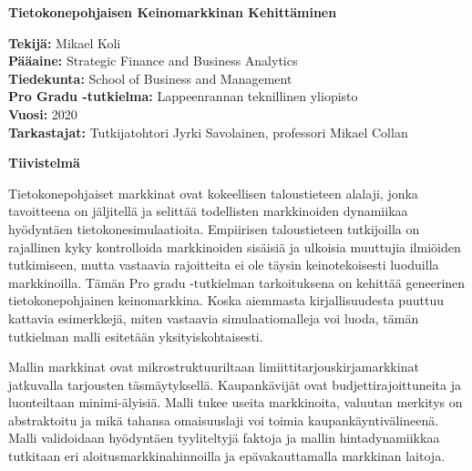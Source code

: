 

\thispagestyle{plain}
\begin{center}
    \Large
    \textbf{Tietokonepohjaisen Keinomarkkinan Kehitt\"aminen}
        
    \vspace{0.4cm}
        
    \vspace{0.4cm}
    \begin{flushleft}
        \normalsize
        \textbf{Tekijä:} Mikael Koli \\
        \textbf{Pääaine:} Strategic Finance and Business Analytics \\
        \textbf{Tiedekunta:} School of Business and Management \\
        \textbf{Pro Gradu -tutkielma:} Lappeenrannan teknillinen yliopisto  \\
        \textbf{Vuosi:} 2020 \\
        \textbf{Tarkastajat:} Tutkijatohtori Jyrki Savolainen, professori Mikael Collan
    \end{flushleft}
       
    \vspace{0.5cm}
    \textbf{Tiivistelmä}
\end{center}

Tietokonepohjaiset markkinat ovat kokeellisen taloustieteen alalaji, jonka tavoitteena
on jäljitellä ja selittää todellisten markkinoiden dynamiikaa hyödyntäen
tietokonesimulaatioita. Empiirisen taloustieteen tutkijoilla on rajallinen kyky kontrolloida
markkinoiden sisäisiä ja ulkoisia muuttujia ilmiöiden tutkimiseen, mutta vastaavia rajoitteita
ei ole täysin keinotekoisesti luoduilla markkinoilla. Tämän Pro gradu -tutkielman tarkoituksena on 
kehittää geneerinen tietokonepohjainen keinomarkkina. Koska aiemmasta kirjallisuudesta puuttuu 
kattavia esimerkkejä, miten vastaavia simulaatiomalleja voi luoda, tämän tutkielman malli esitetään
yksityiskohtaisesti.


Mallin markkinat ovat mikrostruktuuriltaan limiittitarjouskirjamarkkinat jatkuvalla tarjousten täsmäytyksellä.
Kaupankävijät ovat budjettirajoittuneita ja luonteiltaan minimi-älyisiä. Malli tukee useita markkinoita, 
valuutan merkitys on abstraktoitu ja mikä tahansa omaisuuslaji voi toimia kaupankäyntivälineenä. 
Malli validoidaan hyödyntäen tyyliteltyjä faktoja ja mallin hintadynamiikkaa
tutkitaan eri aloitusmarkkinahinnoilla ja epävakauttamalla markkinan laitoja.

